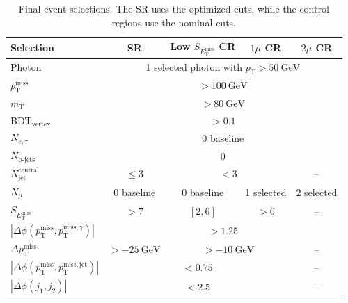 \begin{table}[ht]
\centering
\caption{Final event selections. The SR uses the optimized cuts, while the control regions use the nominal cuts.}
\label{tab:final-cuts}
\begin{tabular}{l|c|c|c|c}
\toprule
Selection & SR & Low $S_{E_{\mathrm{T}}^{\mathrm{miss}}}$ CR & $1\mu$ CR & $2\mu$ CR \\
\midrule

Photon 
& \multicolumn{4}{c}{1 selected photon with $p_{\mathrm{T}} > 50~\mathrm{GeV}$} \\

$p_{\mathrm{T}}^{\mathrm{miss}}$ 
& \multicolumn{4}{c}{$>100~\mathrm{GeV}$} \\

$m_{\mathrm{T}}$ 
& \multicolumn{4}{c}{$>80~\mathrm{GeV}$} \\

BDT$_{\mathrm{vertex}}$ 
& \multicolumn{4}{c}{$>0.1$} \\

$N_{e,\tau}$ 
& \multicolumn{4}{c}{0 baseline} \\

$N_{\mathrm{b\text{-}jets}}$ 
& \multicolumn{4}{c}{0} \\

\midrule

$N_{\mathrm{jet}}^{\mathrm{central}}$ 
& $\leq 3$ 
& \multicolumn{2}{c|}{$<3$} 
& -- \\

$N_{\mu}$ 
& 0 baseline 
& 0 baseline 
& 1 selected 
& 2 selected \\

\midrule

$S_{E_{\mathrm{T}}^{\mathrm{miss}}}$ 
& $>7$ 
& $[2,6]$ 
& $>6$ 
& -- \\

\midrule

$\left|\Delta\phi(p_{\mathrm{T}}^{\mathrm{miss}}, p_{\mathrm{T}}^{\mathrm{miss},\gamma})\right|$ 
& \multicolumn{4}{c}{$>1.25$} \\

$\Delta p_{\mathrm{T}}^{\mathrm{miss}}$ 
& $>-25~\mathrm{GeV}$ 
& \multicolumn{2}{c|}{$>-10~\mathrm{GeV}$} 
& -- \\

$\left|\Delta\phi(p_{\mathrm{T}}^{\mathrm{miss}}, p_{\mathrm{T}}^{\mathrm{miss,jet}})\right|$ 
& \multicolumn{3}{c|}{$<0.75$} 
& -- \\

$\left|\Delta\phi(j_1,j_2)\right|$ 
& \multicolumn{3}{c|}{$<2.5$} 
& -- \\


\end{tabular}
\end{table}
